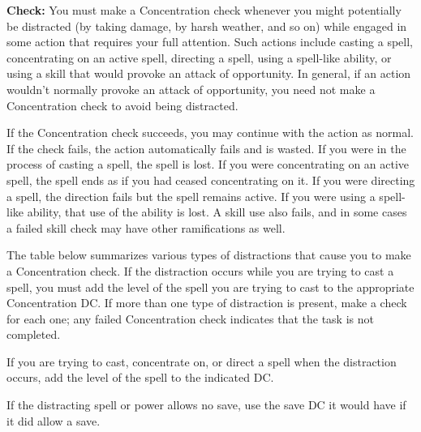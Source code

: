\textbf{Check:} You must make a Concentration check whenever you might potentially be distracted (by taking damage, by harsh weather, and so on) while engaged in some action that requires your full attention. Such actions include casting a spell, concentrating on an active spell, directing a spell, using a spell-like ability, or using a skill that would provoke an attack of opportunity. In general, if an action wouldn't normally provoke an attack of opportunity, you need not make a Concentration check to avoid being distracted.

If the Concentration check succeeds, you may continue with the action as normal. If the check fails, the action automatically fails and is wasted. If you were in the process of casting a spell, the spell is lost. If you were concentrating on an active spell, the spell ends as if you had ceased concentrating on it. If you were directing a spell, the direction fails but the spell remains active. If you were using a spell-like ability, that use of the ability is lost. A skill use also fails, and in some cases a failed skill check may have other ramifications as well.

The table below summarizes various types of distractions that cause you to make a Concentration check. If the distraction occurs while you are trying to cast a spell, you must add the level of the spell you are trying to cast to the appropriate Concentration DC. If more than one type of distraction is present, make a check for each one; any failed Concentration check indicates that the task is not completed.

If you are trying to cast, concentrate on, or direct a spell when the distraction occurs, add the level of the spell to the indicated DC.

If the distracting spell or power allows no save, use the save DC it would have if it did allow a save.

